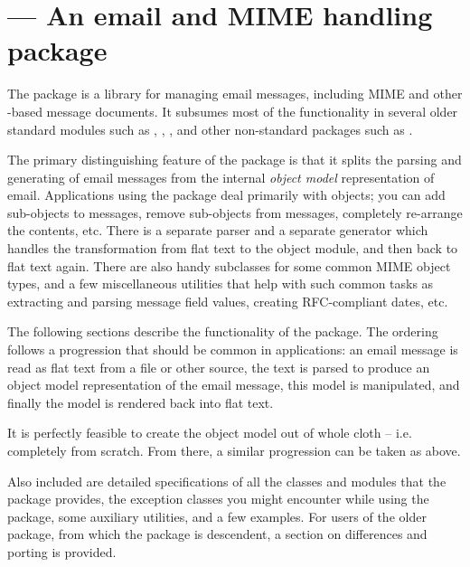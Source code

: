 
\section{ ---
	 An email and MIME handling package}



The  package is a library for managing email messages,
including MIME and other -based message documents.  It
subsumes most of the functionality in several older standard modules
such as , , , and
other non-standard packages such as .

The primary distinguishing feature of the  package is
that it splits the parsing and generating of email messages from the
internal \emph{object model} representation of email.  Applications
using the  package deal primarily with objects; you can
add sub-objects to messages, remove sub-objects from messages,
completely re-arrange the contents, etc.  There is a separate parser
and a separate generator which handles the transformation from flat
text to the object module, and then back to flat text again.  There
are also handy subclasses for some common MIME object types, and a few
miscellaneous utilities that help with such common tasks as extracting
and parsing message field values, creating RFC-compliant dates, etc.

The following sections describe the functionality of the
 package.  The ordering follows a progression that
should be common in applications: an email message is read as flat
text from a file or other source, the text is parsed to produce an
object model representation of the email message, this model is
manipulated, and finally the model is rendered back into
flat text.

It is perfectly feasible to create the object model out of whole cloth
-- i.e. completely from scratch.  From there, a similar progression can
be taken as above.  

Also included are detailed specifications of all the classes and
modules that the  package provides, the exception
classes you might encounter while using the  package,
some auxiliary utilities, and a few examples.  For users of the older
 package, from which the  package is
descendent, a section on differences and porting is provided.

